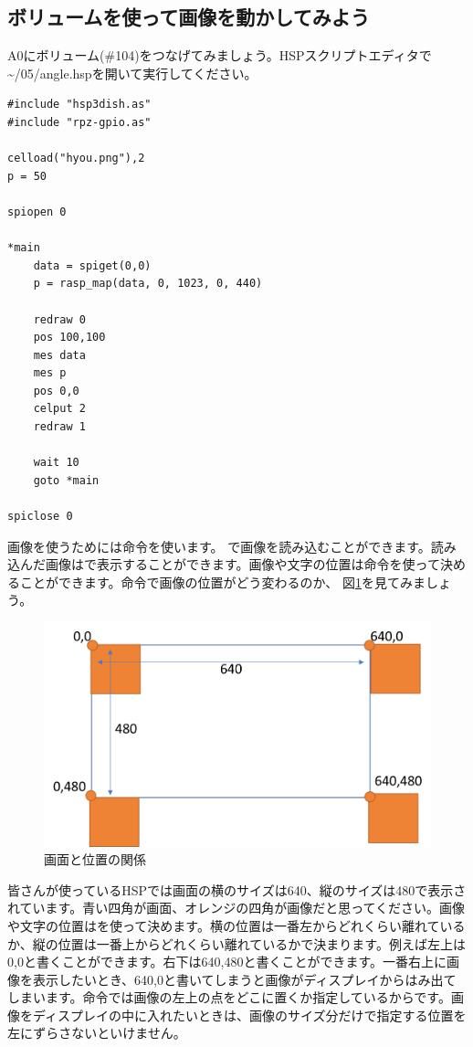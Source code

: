 \subsection{ボリュームを使って画像を動かしてみよう}
A0にボリューム(\#104)をつなげてみましょう。HSPスクリプトエディタで\textasciitilde /05/angle.hspを開いて実行してください。\\

\begin{lstlisting}[caption=angle.hsp,label=angle.hsp]
#include "hsp3dish.as"
#include "rpz-gpio.as"

celload("hyou.png"),2
p = 50

spiopen 0

*main
	data = spiget(0,0)
	p = rasp_map(data, 0, 1023, 0, 440)

	redraw 0
	pos 100,100
	mes data
	mes p
	pos 0,0
	celput 2
	redraw 1

	wait 10	
	goto *main

spiclose 0
\end{lstlisting}

画像を使うためには命令を使います。
で画像を読み込むことができます。読み込んだ画像はで表示することができます。画像や文字の位置は命令を使って決めることができます。命令で画像の位置がどう変わるのか、 図\ref{angle.hsp}を見てみましょう。

\begin{figure}[H]
\centering
\includegraphics[scale=0.8]{images/chap05/text05-img034.png}
\caption{画面と位置の関係}
\label{angle.hsp}
\end{figure}

皆さんが使っているHSPでは画面の横のサイズは640、縦のサイズは480で表示されています。青い四角が画面、オレンジの四角が画像だと思ってください。画像や文字の位置はを使って決めます。横の位置は一番左からどれくらい離れているか、縦の位置は一番上からどれくらい離れているかで決まります。例えば左上は0,0と書くことができます。右下は640,480と書くことができます。一番右上に画像を表示したいとき、640,0と書いてしまうと画像がディスプレイからはみ出てしまいます。命令では画像の左上の点をどこに置くか指定しているからです。画像をディスプレイの中に入れたいときは、画像のサイズ分だけで指定する位置を左にずらさないといけません。\\

